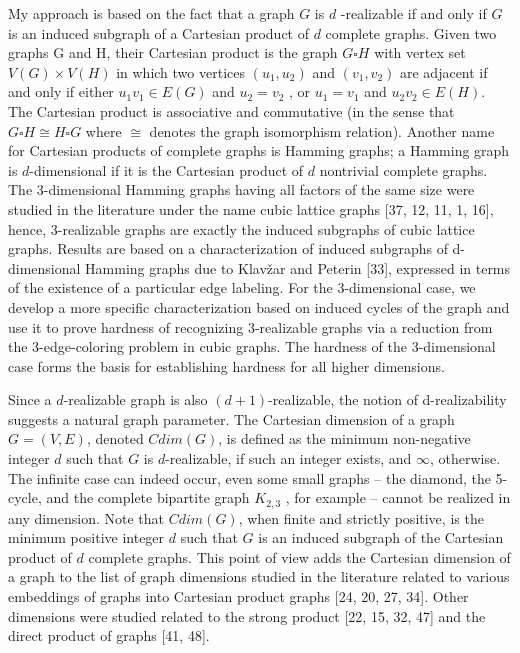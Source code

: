 \documentclass[12pt,a4paper,titlepage,openany]{report}
\begin{document}
My approach is based on the fact that a graph $G$ is $d$ -realizable if and only if $G$ is an induced subgraph of a Cartesian product of $d$ complete graphs. Given two graphs G and H, their Cartesian product is the graph $G\square H$ with vertex set $V (G) \times V (H)$ in which two
vertices $(u_1 , u_2 )$ and $(v_1 , v_2 )$ are adjacent if and only if either $u_1 v_1\in E(G)$ and $u_2 = v_2$ ,
or $u_1 = v_1$ and $u_2 v_2 \in E(H)$. The Cartesian product is associative and commutative (in the sense that $G\square H \cong H\square G$ where $\cong$ denotes the graph isomorphism relation). Another
name for Cartesian products of complete graphs is Hamming graphs; a Hamming graph is $d$-dimensional if it is the Cartesian product of $d$ nontrivial complete graphs. The 3-dimensional Hamming graphs having all factors of the same size were studied in the literature under the name cubic lattice graphs [37, 12, 11, 1, 16], hence, 3-realizable graphs are exactly the induced subgraphs of cubic lattice graphs. Results are based on a characterization of induced subgraphs of d-dimensional Hamming graphs due to Klav\v zar and Peterin [33], expressed in terms of the existence of a particular edge labeling. For the 3-dimensional case, we develop a more specific characterization based on induced cycles of the graph and use it to prove hardness of recognizing 3-realizable graphs via a reduction from the 3-edge-coloring problem
in cubic graphs. The hardness of the 3-dimensional case forms the basis for establishing hardness for all higher dimensions.\newline

Since a $d$-realizable graph is also $(d + 1)$-realizable, the notion of d-realizability suggests a natural graph parameter. The Cartesian dimension of a graph $G = (V, E)$, denoted $Cdim(G)$, is defined as the minimum non-negative integer $d$ such that $G$ is $d$-realizable, if such an integer exists, and $\infty$, otherwise. The infinite case can indeed occur, even some small graphs – the diamond, the 5-cycle, and the complete bipartite graph $K_{2,3}$ , for example – cannot be realized in any dimension. Note that $Cdim(G)$, when finite and strictly positive, is the minimum positive integer $d$ such that $G$ is an induced subgraph of the Cartesian product
of $d$ complete graphs. This point of view adds the Cartesian dimension of a graph to the list of graph dimensions studied in the literature related to various embeddings of graphs into Cartesian product graphs [24, 20, 27, 34]. Other dimensions were studied related to the
strong product [22, 15, 32, 47] and the direct product of graphs [41, 48].
\end{document}
